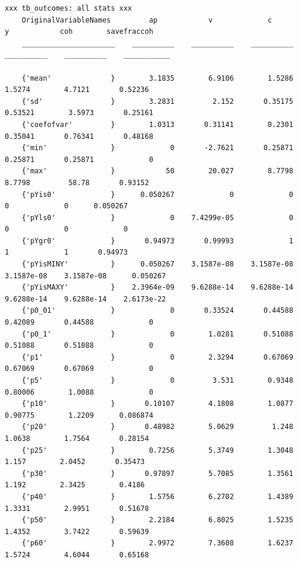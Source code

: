 \documentclass[
]{book}
\begin{document}
\begin{verbatim}
xxx tb_outcomes: all stats xxx
    OriginalVariableNames         ap            v             c             y            coh        savefraccoh
    ______________________    __________    __________    __________    __________    __________    ___________

    {'mean'              }        3.1835        6.9106        1.5286        1.5274        4.7121       0.52236 
    {'sd'                }        3.2831         2.152       0.35175       0.53521        3.5973       0.25161 
    {'coefofvar'         }        1.0313       0.31141        0.2301       0.35041       0.76341       0.48168 
    {'min'               }             0       -2.7621       0.25871       0.25871       0.25871             0 
    {'max'               }            50        20.027        8.7798        8.7798         58.78       0.93152 
    {'pYis0'             }      0.050267             0             0             0             0      0.050267 
    {'pYls0'             }             0    7.4299e-05             0             0             0             0 
    {'pYgr0'             }       0.94973       0.99993             1             1             1       0.94973 
    {'pYisMINY'          }      0.050267    3.1587e-08    3.1587e-08    3.1587e-08    3.1587e-08      0.050267 
    {'pYisMAXY'          }    2.3964e-09    9.6288e-14    9.6288e-14    9.6288e-14    9.6288e-14    2.6173e-22 
    {'p0_01'             }             0       0.33524       0.44588       0.42089       0.44588             0 
    {'p0_1'              }             0        1.0281       0.51088       0.51088       0.51088             0 
    {'p1'                }             0        2.3294       0.67069       0.67069       0.67069             0 
    {'p5'                }             0         3.531        0.9348       0.80006        1.0088             0 
    {'p10'               }       0.10107        4.1808        1.0877       0.90775        1.2209      0.086874 
    {'p20'               }       0.48982        5.0629         1.248        1.0638        1.7564       0.28154 
    {'p25'               }        0.7256        5.3749        1.3048         1.157        2.0452       0.35473 
    {'p30'               }       0.97897        5.7085        1.3561         1.192        2.3425        0.4186 
    {'p40'               }        1.5756        6.2702        1.4389        1.3331        2.9951       0.51678 
    {'p50'               }        2.2184        6.8025        1.5235        1.4352        3.7422       0.59639 
    {'p60'               }        2.9972        7.3608        1.6237        1.5724        4.6044       0.65168 

\end{verbatim}
\end{document}
